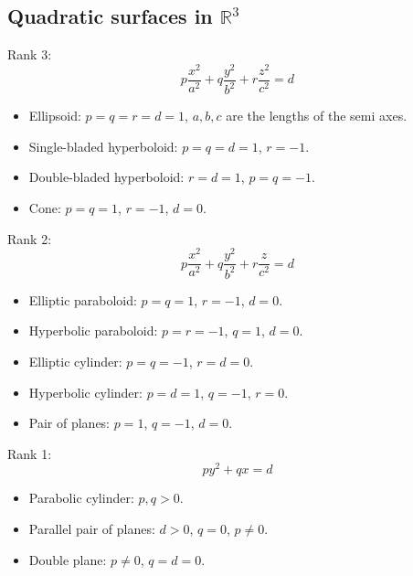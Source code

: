 \subsection{Quadratic surfaces in $ \mathbb{R}^3$}
Rank 3:
\[
p\frac{x^2}{a^2}+q\frac{y^2}{b^2}+r\frac{z^2}{c^2}=d
\]
\begin{itemize}
	\item Ellipsoid: $p=q=r=d=1$, $a,b,c$ are the lengths of the semi axes.
	\item Single-bladed hyperboloid: $p=q=d=1$, $r=-1$.
	\item Double-bladed hyperboloid: $r=d=1$, $p=q=-1$.
	\item Cone: $p=q=1$, $r=-1$, $d=0$.
\end{itemize}
Rank 2:
\[
p\frac{x^2}{a^2}+q\frac{y^2}{b^2}+r\frac{z}{c^2}=d
\]
\begin{itemize}
	\item Elliptic paraboloid: $p=q=1$, $r=-1$, $d=0$.
	\item Hyperbolic paraboloid: $p=r=-1$, $q=1$, $d=0$.
	\item Elliptic cylinder: $p=q=-1$, $r=d=0$.
	\item Hyperbolic cylinder: $p=d=1$, $q=-1$, $r=0$.
	\item Pair of planes: $p=1$, $q=-1$, $d=0$.
\end{itemize}
Rank 1:
\[
py^2+qx=d
\]
\begin{itemize}
	\item Parabolic cylinder: $p,q>0$.
	\item Parallel pair of planes: $d>0$, $q=0$, $p\neq 0$.
	\item Double plane: $p\neq 0$, $q=d=0$.
\end{itemize}
